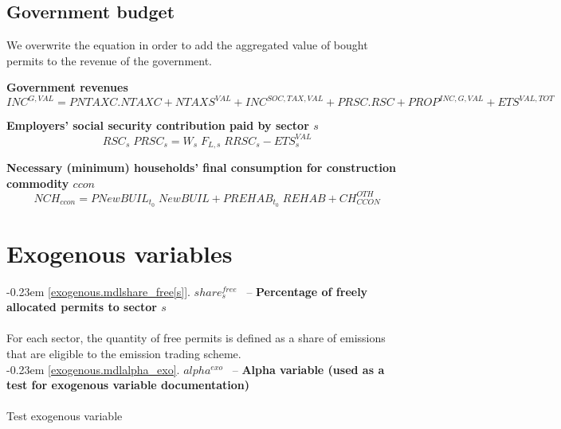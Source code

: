 \documentclass[12pt]{article}
\numberwithin{equation}{section}
\begin{document}
\subsection{Government budget}


We overwrite the equation in order to add the aggregated value of bought permits to the revenue of the government.

\noindent \textbf{Government revenues} 
\begin{dmath}
INC^{G,VAL} = PNTAXC . NTAXC + NTAXS^{VAL} + INC^{SOC,TAX,VAL} + PRSC . RSC + PROP^{INC,G,VAL} + ETS^{VAL,TOT}
\label{ETS.mdlINC_G_VAL}
\end{dmath}

\noindent \textbf{Employers' social security contribution paid by sector $s$} 
\begin{dmath}
RSC_{s} \; PRSC_{s} = W_{s} \; F_{L, s} \; RRSC_{s} - ETS^{VAL}_{s}
\label{ETS.mdlRSC[s]}
\end{dmath}


\noindent \textbf{Necessary (minimum) households' final consumption for construction commodity $ccon$} 
\begin{dmath}
NCH_{ccon}  = PNewBUIL_{t_0} \; NewBUIL + PREHAB_{t_0} \; REHAB + CH^{OTH}_{CCON} 
\label{ETS.mdlNCH[ccon]}
\end{dmath}
\newpage\section{Exogenous variables}



\noindent \kern-0.23em \noindent \begingroup {} \label{exogenous.mdlshare_free[s]}\ref{exogenous.mdlshare_free[s]}.
         
        \ensuremath{share^{free}_{s}}~ \endgroup -- \noindent \textbf{Percentage of freely allocated permits to sector $s$}  \\ \\[-8pt]For each sector, the quantity of free permits is defined as a share of emissions that are eligible to the emission trading scheme. \\




\noindent \kern-0.23em \noindent \begingroup {} \label{exogenous.mdlalpha_exo}\ref{exogenous.mdlalpha_exo}.
         
        \ensuremath{alpha^{exo}}~ \endgroup -- \noindent \textbf{Alpha variable (used as a test for exogenous variable documentation)}  \\ \\[-8pt]Test exogenous variable
\newpage
\end{document}
